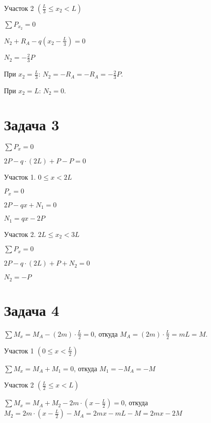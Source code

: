 Участок 2 $ \left(\frac{L}{3} \le x_2 < L\right) $

$ \sum P_{x_2} = 0 $

$ N_2 + R_A - q \left(x_2 - \frac{L}{3}\right) = 0 $

$ N_2 = -\frac{2}{3} P $

При $ x_2 = \frac{L}{3} $: $ N_2 = -R_A = -R_A = -\frac{2}{3} P $.

При $ x_2 = L $:           $ N_2 = 0 $.

\section{Задача 3}

$ \sum P_x = 0 $

$ 2P - q \cdot \left(2L\right) + P - P = 0 $

\vspace{1.5ex}

Участок 1. $ 0 \le x < 2L $

$ P_x = 0 $

$ 2P - qx + N_1 = 0 $

$ N_1 = qx - 2P $

\vspace{1.5ex}

Участок 2. $ 2L \le x_2 < 3L $

$ \sum P_x = 0 $

$ 2P - q \cdot \left(2L\right) + P + N_2 = 0 $

$ N_2 = -P $


\section{Задача 4}

$ \sum M_x = M_A - \left(2m\right) \cdot \frac{L}{2} = 0 $,
откуда $ M_A = \left(2m\right) \cdot \frac{L}{2} = mL =  M $.

\vspace{1.5ex}

Участок 1 $ \left(0 \le x < \frac{L}{2}\right) $

$ \sum M_x = M_A + M_1 = 0 $,
откуда $ M_1 = -M_A = -M $

\vspace{1.5ex}

Участок 2 $ \left(\frac{L}{2} \le x < L\right) $

$ \sum M_x = M_A + M_2 - 2m \cdot \left(x - \frac{L}{2}\right) = 0 $,
откуда $ M_2 = 2m \cdot \left(x - \frac{L}{2}\right) - M_A = 2mx - mL - M = 2mx - 2M $


